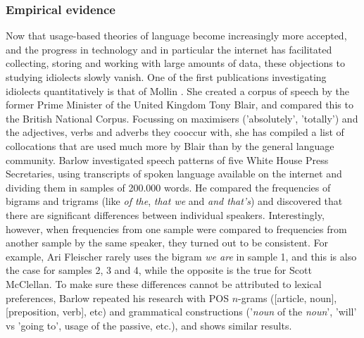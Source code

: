 \documentclass[11pt]{article}
\begin{document}
\subsubsection{Empirical evidence}
Now that usage-based theories of language become increasingly more accepted, and the progress in technology and in particular the internet has facilitated collecting, storing and working with large amounts of data, these objections to studying idiolects slowly vanish. One of the first publications investigating idiolects quantitatively is that of Mollin . She created a corpus of speech by the former Prime Minister of the United Kingdom Tony Blair, and compared this to the British National Corpus. Focussing on maximisers ('absolutely', 'totally') and the adjectives, verbs and adverbs they cooccur with, she has compiled a list of collocations that are used much more by Blair than by the general language community. Barlow  investigated speech patterns of five White House Press Secretaries, using transcripts of spoken language available on the internet and dividing them in samples of 200.000 words. He compared the frequencies of bigrams and trigrams (like \emph{of the}, \emph{that we} and \emph{and that's}) and discovered that there are significant differences between individual speakers. Interestingly, however, when frequencies from one sample were compared to frequencies from another sample by the same speaker, they turned out to be consistent. For example, Ari Fleischer rarely uses the bigram \emph{we are} in sample 1, and this is also the case for samples 2, 3 and 4, while the opposite is the true for Scott McClellan. To make sure these differences cannot be attributed to lexical preferences, Barlow repeated his research with POS $n$-grams ([article, noun], [preposition, verb], etc) and grammatical constructions ('\emph{noun} of the \emph{noun}',  'will' vs 'going to', usage of the passive, etc.), and shows similar results.
\end{document}
